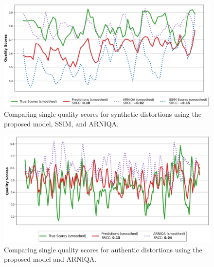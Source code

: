 \begin{figure}[ht]
    \centering
    \includegraphics[keepaspectratio,width=15cm]{img/baseline_s.png}
    \caption{Comparing single quality scores for synthetic distortions using the proposed model, SSIM, and ARNIQA.}
    \label{fig:BS}
\end{figure}

\begin{figure}[ht]
    \centering
    \includegraphics[keepaspectratio,width=15cm]{img/baseline_a.png}
    \caption{Comparing single quality scores for authentic distortions using the proposed model and ARNIQA.}
    \label{fig:BA}
\end{figure}

\clearpage
